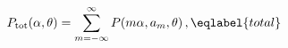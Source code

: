 \begin{equation}
P_{\rm tot}(\alpha,\theta) = \sum_{m=-\infty}^\infty P(m\alpha,a_m,\theta)\,,
\eqlabel{total}
\end{equation}

